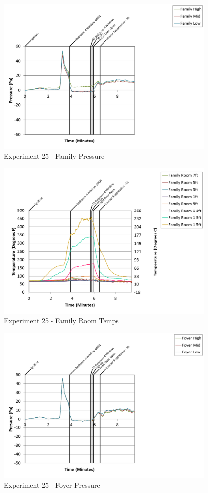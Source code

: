 \documentclass{article}
\begin{document}
\begin{appendices}
\clearpage

\begin{figure}[h!]
	\centering
	\includegraphics[height=3.05in]{0_Images/Results_Charts/Exp_25_Charts/FamilyPressure.png}
	\caption{Experiment 25 - Family Pressure}
\end{figure}


\begin{figure}[h!]
	\centering
	\includegraphics[height=3.05in]{0_Images/Results_Charts/Exp_25_Charts/FamilyRoomTemps.png}
	\caption{Experiment 25 - Family Room Temps}
\end{figure}

\clearpage

\begin{figure}[h!]
	\centering
	\includegraphics[height=3.05in]{0_Images/Results_Charts/Exp_25_Charts/FoyerPressure.png}
	\caption{Experiment 25 - Foyer Pressure}
\end{figure}



\end{appendices}
\end{document}

